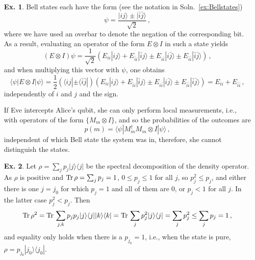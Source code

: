 \documentclass[a4paper,12pt]{article}
\def\Tr{\ensuremath{\mathop{\rm Tr}}{}}
\theoremstyle{definition}
\newtheorem{exercise}{Ex.}[section]
\begin{document}
\begin{exercise}\label{ex:Bellstates2}
 Bell states each have the form (see the notation in Soln.~\ref{ex:Bellstates})
 \[
  \psi = \frac{|ij\rangle \pm |\bar{i}\bar{j}\rangle}{\sqrt{2}}\,,
 \]
 where we have used an overbar to denote the negation of the corresponding bit. As a result, evaluating an operator of the form $E\otimes I$ in such a state yields
 \[
  (E\otimes I)\psi = \frac{1}{\sqrt{2}}( E_{ii}|ij\rangle + E_{\bar{i}i}|\bar{i}{j}\rangle \pm E_{i\bar{i}}|i\bar{j}\rangle \pm E_{\bar{i}\bar{i}}|\bar{i}\bar{j}\rangle)\,,
 \]
 and when multiplying this vector with $\psi$, one obtains
 \[
  \langle\psi| E\otimes I|\psi\rangle = \frac{1}{2}(\langle ij| \pm \langle\bar{i}\bar{j}|)( E_{ii}|ij\rangle + E_{\bar{i}i}|\bar{i}{j}\rangle \pm E_{i\bar{i}}|i\bar{j}\rangle \pm E_{\bar{i}\bar{i}}|\bar{i}\bar{j}\rangle) = E_{ii} + E_{\bar{i}\bar{i}}\,,
 \]
 independently of $i$ and $j$ and the sign.
 
 If Eve intercepts Alice's qubit, she can only perform local measurements, i.e.,  with operators of the form $\{M_m\otimes I\}$, and so the probabilities of the outcomes are
 \[
  p(m) = \langle \psi | M_m^\dagger M_m \otimes I |\psi\rangle\,,
 \]
 independent of which Bell state the system was in, therefore, she cannot distinguish the states.
\end{exercise}
 
\begin{exercise}
 Let $\rho = \sum_j p_j |j\rangle\langle j|$ be the spectral decomposition of the density operator. As $\rho$ is positive and $\Tr \rho = \sum_j p_j = 1$, $0\le p_j \le 1$ for all $j$, so $p_j^2 \le p_j$, and either there is one $j=j_0$ for which $p_j=1$ and all of them are 0, or $p_j < 1$ for all $j$. In the latter case $p_j^2 < p_j$. Then
 \[
  \Tr \rho^2 = \Tr \sum_{j,k }p_j p_j |j\rangle\langle j| |k\rangle\langle k| = \Tr \sum_j p_j^2 |j\rangle\langle j| = \sum_j p_j^2 \le \sum_j p_j =1\,,
 \]
 and equality only holds when there is a $p_{j_0}=1$, i.e., when the state is pure, $\rho = p_{j_0}|j_0\rangle\langle j_0 |$.
\end{exercise}
\end{document}
